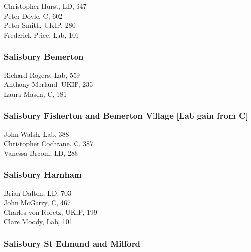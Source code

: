 \documentclass[a4paper,openany,10pt]{book}
\begin{document}


Christopher Hurst, LD, 647\\
Peter Doyle, C, 602\\
Peter Smith, UKIP, 280\\
Frederick Price, Lab, 101\\


\subsubsection*{Salisbury Bemerton}



Richard Rogers, Lab, 559\\
Anthony Morland, UKIP, 235\\
Laura Mason, C, 181\\


\subsubsection*{Salisbury Fisherton and Bemerton Village \hspace*{\fill}\nolinebreak[1]%
\enspace\hspace*{\fill}
[Lab gain from C]}



John Walsh, Lab, 388\\
Christopher Cochrane, C, 387\\
Vanessa Broom, LD, 288\\


\subsubsection*{Salisbury Harnham}



Brian Dalton, LD, 703\\
John McGarry, C, 467\\
Charles von Roretz, UKIP, 199\\
Clare Moody, Lab, 101\\


\subsubsection*{Salisbury St Edmund and Milford}
\end{document}
